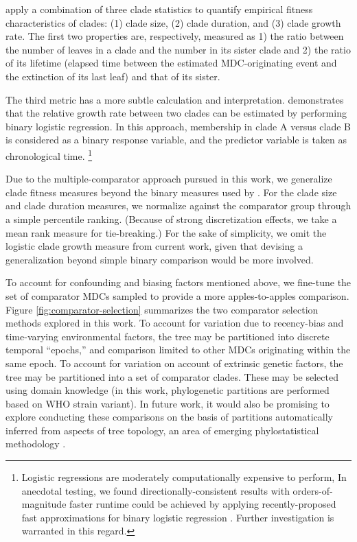 \citet{BonettiFranceschi2024phylogenetic} apply a combination of three clade statistics to quantify empirical fitness characteristics of clades: (1) clade size, (2) clade duration, and (3) clade growth rate.
The first two properties are, respectively, measured as 1) the ratio between the number of leaves in a clade and the number in its sister clade and 2) the ratio of its lifetime (elapsed time between the estimated MDC-originating event and the extinction of its last leaf) and that of its sister.

The third metric has a more subtle calculation and interpretation.
\citet{Volz2023} demonstrates that the relative growth rate between two clades can be estimated by performing binary logistic regression.
In this approach, membership in clade A versus clade B is considered as a binary response variable, and the predictor variable is taken as chronological time.%
\footnote{%
Logistic regressions are moderately computationally expensive to perform,
In anecdotal testing, we found directionally-consistent results with orders-of-magnitude faster runtime could be achieved by applying recently-proposed fast approximations for binary logistic regression \citep{Saran2025}.
Further investigation is warranted in this regard.
}

Due to the multiple-comparator approach pursued in this work, we generalize clade fitness measures beyond the binary measures used by \citet{BonettiFranceschi2024phylogenetic}.
For the clade size and clade duration measures, we normalize against the comparator group through a simple percentile ranking.
(Because of strong discretization effects, we take a mean rank measure for tie-breaking.)
For the sake of simplicity, we omit the logistic clade growth measure from current work, given that devising a generalization beyond simple binary comparison would be more involved.



To account for confounding and biasing factors mentioned above, we fine-tune the set of comparator MDCs sampled to provide a more apples-to-apples comparison.
Figure \ref{fig:comparator-selection} summarizes the two comparator selection methods explored in this work.
To account for variation due to recency-bias and time-varying environmental factors, the tree may be partitioned into discrete temporal ``epochs,'' and comparison limited to other MDCs originating within the same epoch.
To account for variation on account of extrinsic genetic factors, the tree may be partitioned into a set of comparator clades.
These may be selected using domain knowledge (in this work, phylogenetic partitions are performed based on WHO strain variant).
In future work, it would also be promising to explore conducting these comparisons on the basis of partitions automatically inferred from aspects of tree topology, an area of emerging phylostatistical methodology \citep{Lefrancq2025}.

